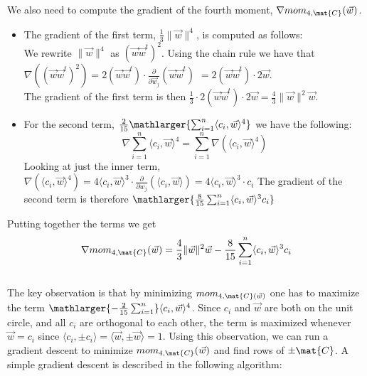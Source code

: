 We also need to compute the gradient of the fourth moment, $\nabla mom_{4, \mat{C}} (\vec{w})$.
\begin{itemize}
    \item The gradient of the first term, $\frac{1}{3} \lVert \vec{w} \rVert ^4$, is computed as follows: \\
        We rewrite $\lVert \vec{w} \rVert ^4$ as $(\vec{w}\vec{w}^t)^2$. Using the chain rule we have that \\
        $\nabla ((\vec{w}\vec{w}^t)^2) = 2(\vec{w}\vec{w}^t) \cdot \frac{\partial}{\partial \vec{w}_j}(\vec{w}\vec{w}^t)$
        $= 2(\vec{w}\vec{w}^t) \cdot 2 \vec{w}$. \\ 
        The gradient of the first term is then $\frac{1}{3} \cdot 2(\vec{w}\vec{w}^t) \cdot 2 \vec{w} = \frac{4}{3} \lVert \vec{w} \rVert ^2 \vec{w}$.
    \item For the second term, $\frac{2}{15} \mathlarger{\sum_{i=1}^{n} \langle c_i, \vec{w} \rangle ^4}$ we have the following:
        \[\nabla \sum_{i=1}^{n}\langle c_i, \vec{w} \rangle ^4 = \sum_{i=1}^{n}\nabla (\langle c_i, \vec{w} \rangle ^4)\]
        Looking at just the inner term, $\nabla (\langle c_i, \vec{w} \rangle ^4) = 4 \langle c_i, \vec{w} \rangle ^3 
        \cdot \frac{\partial}{\partial w_j} (\langle c_i, \vec{w} \rangle) = 4 \langle c_i, \vec{w} \rangle ^3 \cdot c_i$
        The gradient of the second term is therefore $\mathlarger{\frac{8}{15} \sum_{i=1}^{n} \langle c_i, \vec{w} \rangle ^3 c_i}$
\end{itemize}
Putting together the terms we get
\[ \nabla mom_{4, \mat{C}}(\vec{w}) =  \frac{4}{3} \lVert \vec{w} \rVert ^2 \vec{w} - \frac{8}{15} \sum_{i=1}^{n} \langle c_i, \vec{w} \rangle ^3 c_i\] \\
The key observation is that by minimizing $mom_{4, \mat{C}(\vec{w})}$ one has to maximize the term 
$ \mathlarger{-\frac{2}{15}\sum_{i=1}^{n}} \langle c_i, \vec{w} \rangle ^4$. Since $c_i$ and $\vec{w}$ are both on the unit circle, and
all $c_i$ are orthogonal to each other, the term is maximized whenever $\vec{w} = c_i$ since $\langle c_i, \pm c_i \rangle = \langle \vec{w}, \pm \vec{w} \rangle = 1$.
Using this observation, we can run a gradient descent to minimize $mom_{4, \mat{C}}(\vec{w})$ and find rows of $\pm \mat{C}$.
A simple gradient descent is described in the following algorithm:

